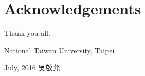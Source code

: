 
\chapter{Acknowledgements}

\vspace{8mm}

\noindent
Thank you all.

\vspace{8mm}

\noindent
National Taiwan University, Taipei

\noindent
July, 2016 \hfill 吳啟允 \ %

